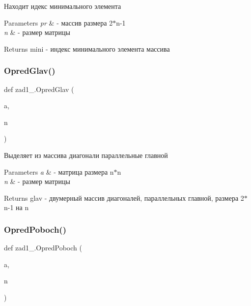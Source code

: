 Находит идекс минимального элемента 


\begin{DoxyParams}{Parameters}
{\em pr} & -\/ массив размера 2$\ast$n-\/1 \\
\hline
{\em n} & -\/ размер матрицы \\
\hline
\end{DoxyParams}
\begin{DoxyReturn}{Returns}
mini -\/ индекс минимального элемента массива 
\end{DoxyReturn}
\mbox{\label{namespacezad1__7_afbae12f0e97d9c081b4566028822d408}} 
\subsubsection{\texorpdfstring{Opred\+Glav()}{OpredGlav()}}
{\footnotesize\ttfamily def zad1\+\_.\+Opred\+Glav (\begin{DoxyParamCaption}\item[{}]{a,  }\item[{}]{n }\end{DoxyParamCaption})}



Выделяет из массива диагонали параллельные главной 


\begin{DoxyParams}{Parameters}
{\em a} & -\/ матрица размера n$\ast$n \\
\hline
{\em n} & -\/ размер матрицы \\
\hline
\end{DoxyParams}
\begin{DoxyReturn}{Returns}
glav -\/ двумерный массив диагоналей, параллельных главной, размера 2$\ast$n-\/1 на n 
\end{DoxyReturn}
\mbox{\label{namespacezad1__7_abc57efa05ad7ba5180f4801687a61d1a}} 
\subsubsection{\texorpdfstring{Opred\+Poboch()}{OpredPoboch()}}
{\footnotesize\ttfamily def zad1\+\_.\+Opred\+Poboch (\begin{DoxyParamCaption}\item[{}]{a,  }\item[{}]{n }\end{DoxyParamCaption})}



